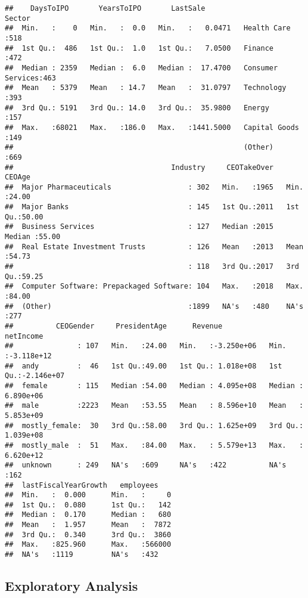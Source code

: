 \documentclass[]{article}
\begin{document}
\begin{verbatim}
##    DaysToIPO       YearsToIPO       LastSale                       Sector   
##  Min.   :    0   Min.   :  0.0   Min.   :   0.0471   Health Care      :518  
##  1st Qu.:  486   1st Qu.:  1.0   1st Qu.:   7.0500   Finance          :472  
##  Median : 2359   Median :  6.0   Median :  17.4700   Consumer Services:463  
##  Mean   : 5379   Mean   : 14.7   Mean   :  31.0797   Technology       :393  
##  3rd Qu.: 5191   3rd Qu.: 14.0   3rd Qu.:  35.9800   Energy           :157  
##  Max.   :68021   Max.   :186.0   Max.   :1441.5000   Capital Goods    :149  
##                                                      (Other)          :669  
##                                     Industry     CEOTakeOver       CEOAge     
##  Major Pharmaceuticals                  : 302   Min.   :1965   Min.   :24.00  
##  Major Banks                            : 145   1st Qu.:2011   1st Qu.:50.00  
##  Business Services                      : 127   Median :2015   Median :55.00  
##  Real Estate Investment Trusts          : 126   Mean   :2013   Mean   :54.73  
##                                         : 118   3rd Qu.:2017   3rd Qu.:59.25  
##  Computer Software: Prepackaged Software: 104   Max.   :2018   Max.   :84.00  
##  (Other)                                :1899   NA's   :480    NA's   :277    
##          CEOGender     PresidentAge      Revenue             netIncome         
##               : 107   Min.   :24.00   Min.   :-3.250e+06   Min.   :-3.118e+12  
##  andy         :  46   1st Qu.:49.00   1st Qu.: 1.018e+08   1st Qu.:-2.146e+07  
##  female       : 115   Median :54.00   Median : 4.095e+08   Median : 6.890e+06  
##  male         :2223   Mean   :53.55   Mean   : 8.596e+10   Mean   : 5.853e+09  
##  mostly_female:  30   3rd Qu.:58.00   3rd Qu.: 1.625e+09   3rd Qu.: 1.039e+08  
##  mostly_male  :  51   Max.   :84.00   Max.   : 5.579e+13   Max.   : 6.620e+12  
##  unknown      : 249   NA's   :609     NA's   :422          NA's   :162         
##  lastFiscalYearGrowth   employees     
##  Min.   :  0.000      Min.   :     0  
##  1st Qu.:  0.080      1st Qu.:   142  
##  Median :  0.170      Median :   680  
##  Mean   :  1.957      Mean   :  7872  
##  3rd Qu.:  0.340      3rd Qu.:  3860  
##  Max.   :825.960      Max.   :566000  
##  NA's   :1119         NA's   :432
\end{verbatim}

\hypertarget{exploratory-analysis}{%
\subsection{Exploratory Analysis}\label{exploratory-analysis}}
\end{document}
